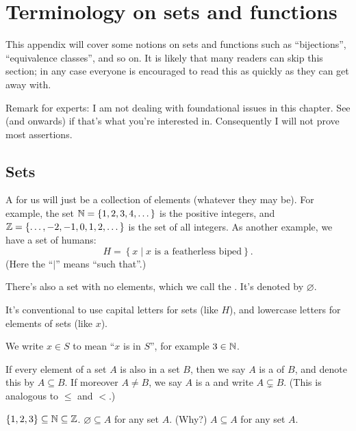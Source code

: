 \chapter{Terminology on sets and functions}
\label{ch:sets_functions}
This appendix will cover some notions on sets and functions
such as ``bijections'', ``equivalence classes'', and so on.
It is likely that many readers can skip this section;
in any case everyone is encouraged to read this as quickly as they can get away with.

Remark for experts: I am not dealing with foundational issues in this chapter.
See  (and onwards) if that's what you're interested in.
Consequently I will not prove most assertions.

\section{Sets}
A  for us will just be a collection of elements (whatever they may be).
For example, the set $\mathbb N = \{1, 2, 3, 4, \dots\}$ is the positive integers,
and $\mathbb Z = \{ \dots, -2, -1, 0, 1, 2, \dots\}$ is the set of all integers.
As another example, we have a set of humans:
\[ H = \left\{ x \mid \text{$x$ is a featherless biped} \right\}. \]
(Here the ``$\mid$'' means ``such that''.)

There's also a set with no elements, which we call the .
It's denoted by $\varnothing$.

It's conventional to use capital letters for sets (like $H$),
and lowercase letters for elements of sets (like $x$).

\begin{definition}
We write $x \in S$ to mean ``$x$ is in $S$'', for example $3 \in \mathbb N$.
\end{definition}

\begin{definition}
	If every element of a set $A$ is also in a set $B$,
	then we say $A$ is a  of $B$, and denote this by $A \subseteq B$.
	If moreover $A \neq B$, we say $A$ is a 
	and write $A \subsetneq B$.
	(This is analogous to $\le$ and $<$.)
\end{definition}
\begin{example}
	\listhack
	\begin{enumerate}[(a)]
		\ii $\{1,2,3\} \subseteq \mathbb N \subseteq \mathbb Z$.
		\ii $\varnothing \subseteq A$ for any set $A$. (Why?)
		\ii $A \subseteq A$ for any set $A$.
	\end{enumerate}
\end{example}

